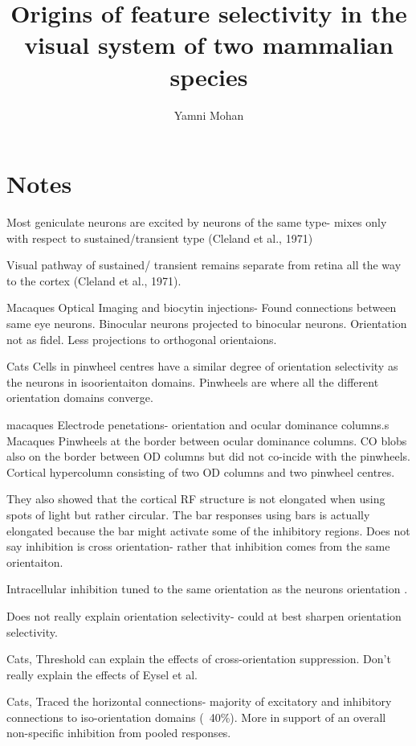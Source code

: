 \documentclass {report}
\begin{document}
	

\title{Origins of feature selectivity in the visual system of two mammalian species}%
\author{Yamni Mohan}
\date{}


\section*{Notes}
Most geniculate neurons are excited by neurons of the same type- mixes only with respect to sustained/transient type (Cleland et al., 1971)

Visual pathway of sustained/ transient remains separate from retina all the way to the cortex (Cleland et al., 1971).

\cite{Malach1993} Macaques Optical Imaging and biocytin injections- Found connections between same eye neurons. Binocular neurons projected to binocular neurons. Orientation not as fidel. Less projections to orthogonal orientaions.

\cite{Maldonado1997} Cats Cells in pinwheel centres have a similar degree of orientation selectivity as the neurons in isoorientaiton domains. Pinwheels are where all the different orientation domains converge.

\cite{Hubel1969} macaques Electrode penetations- orientation and ocular dominance columns.s
\cite{Bartfeld1992a} Macaques Pinwheels at the border between ocular dominance columns. CO blobs also on the border between OD columns but did not co-incide with the pinwheels. Cortical hypercolumn consisting of two OD columns and two pinwheel centres. 

They also showed that the cortical RF structure is not elongated when using spots of light but rather circular. The bar responses using bars is actually elongated because the bar might activate some of the inhibitory regions. Does not say inhibition is cross orientation- rather that inhibition comes from the same orientaiton. 

Intracellular inhibition tuned to the same orientation as the neurons orientation \cite{Anderson2000}.

Does not really explain orientation selectivity- could at best sharpen orientation selectivity.

\cite{Priebe2006} Cats, Threshold can explain the effects of cross-orientation suppression. Don't really explain the effects of Eysel et al.

\cite{Kisvarday1997} Cats, Traced the horizontal connections- majority of excitatory and inhibitory connections to iso-orientation domains (~40\%). More in support of an overall non-specific inhibition from pooled responses.
\end{document}
